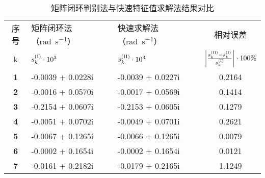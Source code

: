 \begin{table}[htp]
  \renewcommand{\arraystretch}{1.5}
  \centering
  \caption{矩阵闭环判别法与快速特征值求解法结果对比}
  \label{table:Direct-Fast-Comparison}
  \begin{tabularx}{\textwidth}{c>{\centering}X>{\centering}Xc}
    \toprule
    序号        & 矩阵闭环法（\si{\radian\per\s}）        & 快速求解法（\si{\radian\per\s}）       & 相对误差                                                                                                                       \\
    k           & $ s_k^{(\mathrm{\RNum{1}})}\cdot10^{3}$ & $s_k^{(\mathrm{\RNum{2}})}\cdot10^{3}$ & $\left| \frac{s_k^{(\mathrm{\RNum{2}})}-s_k^{(\mathrm{\RNum{1}})}}{s_k^{(\mathrm{\RNum{1}})}} \right| \cdot 100 \si{\percent}$ \\ \midrule
    \textbf{1 } & \num{-0.0039 + 0.0228i}                 & \num{-0.0039 + 0.0227i}                & \num{0.2164}                                                                                                                   \\
    \textbf{2 } & \num{-0.0016 + 0.0570i}                 & \num{-0.0017 + 0.0569i}                & \num{0.1414}                                                                                                                   \\
    \textbf{3 } & \num{-0.2154 + 0.0607i}                 & \num{-0.2153 + 0.0605i}                & \num{0.1279}                                                                                                                   \\
    \textbf{4 } & \num{-0.0051 + 0.0702i}                 & \num{-0.0049 + 0.0701i}                & \num{0.2621}                                                                                                                   \\
    \textbf{5 } & \num{-0.0067 + 0.1265i}                 & \num{-0.0066 + 0.1265i}                & \num{0.0079}                                                                                                                   \\
    \textbf{6 } & \num{-0.0002 + 0.1654i}                 & \num{-0.0002 + 0.1654i}                & \num{0.0121}                                                                                                                   \\
    \textbf{7 } & \num{-0.0161 + 0.2182i}                 & \num{-0.0179 + 0.2165i}                & \num{1.1249}                                                                                                                   \\

\end{tabularx}
\end{table}
